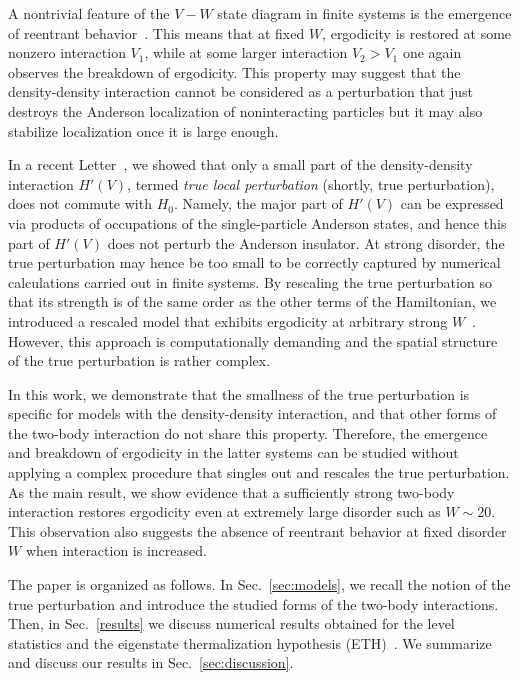 \documentclass[twocolumn,pre,superscriptaddress,10pt,aps,floatfix]{revtex4-1}
\begin{document}
A nontrivial feature of the $V-W$ state diagram in finite systems is the emergence of reentrant behavior~\cite{deluca13,lev15}.
This means that at fixed $W$, ergodicity is restored at some nonzero interaction $V_1$, while at some larger interaction $V_2>V_1$ one again observes the breakdown of ergodicity.
This property may suggest that the density-density interaction cannot be considered as a perturbation that just destroys the Anderson localization of noninteracting particles but it may also stabilize localization once it is large enough. 

In a recent Letter~\cite{krajewski_vidmar_22}, we showed that only a small part of the density-density interaction $H'(V)$, termed {\it true local perturbation} (shortly, true perturbation), does not commute with $H_0$. Namely, the major part of $H'(V)$ can be expressed via products of occupations of the single-particle Anderson states, and hence this part of $H'(V)$ does not perturb  the Anderson insulator. 
At strong disorder, the true perturbation may hence be too small to be correctly captured by numerical calculations carried out in finite systems.
By rescaling the true perturbation so that its strength is of the same order as the other terms of the Hamiltonian, we introduced a rescaled model that exhibits ergodicity at arbitrary strong $W$~\cite{krajewski_vidmar_22}. However, this approach is computationally demanding and the spatial structure of the true perturbation is rather complex.  

In this work, we demonstrate that the smallness of the true perturbation is specific for models with the density-density interaction, and that other forms of the two-body interaction do not share this property. 
Therefore,  the emergence and breakdown of ergodicity  in the latter systems can be studied without applying a complex procedure that singles out and rescales  the true perturbation.
As the main result, we show evidence that a sufficiently strong two-body interaction restores ergodicity even at extremely large disorder such as $W\sim 20$.
This observation also suggests the absence of reentrant behavior at fixed disorder $W$ when interaction is increased.

The paper is organized as follows.
In Sec.~\ref{sec:models}, we recall the notion of the true perturbation and introduce the studied forms of the two-body interactions. Then, in Sec.~\ref{results} we discuss numerical results obtained for the level statistics and the eigenstate thermalization hypothesis (ETH)~\cite{deutsch_91,srednicki_94,rigol_dunjko_08,dalessio_kafri_16}.
We summarize and discuss our results in Sec.~\ref{sec:discussion}.
  
\end{document}
